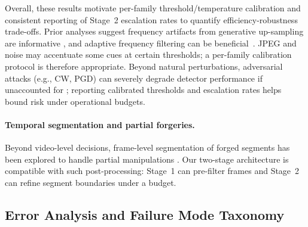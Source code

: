 Overall, these results motivate per\hyp family threshold/temperature calibration and consistent reporting of Stage~2 escalation rates to quantify efficiency\hyp robustness trade\hyp offs. Prior analyses suggest frequency artifacts from generative up\hyp sampling are informative \cite{durall2020watch}, and adaptive frequency filtering can be beneficial~\cite{qian2020thinkingfrequency}. JPEG and noise may accentuate some cues at certain thresholds; a per\hyp family calibration protocol is therefore appropriate. Beyond natural perturbations, adversarial attacks (e.g., CW, PGD) can severely degrade detector performance if unaccounted for \cite{carlini2017towards}; reporting calibrated thresholds and escalation rates helps bound risk under operational budgets.

\paragraph{Temporal segmentation and partial forgeries.} Beyond video\hyp level decisions, frame\hyp level segmentation of forged segments has been explored to handle partial manipulations \cite{undercover2023}. Our two\hyp stage architecture is compatible with such post\hyp processing: Stage~1 can pre\hyp filter frames and Stage~2 can refine segment boundaries under a budget.


\FloatBarrier


\subsection{Error Analysis and Failure Mode Taxonomy}
\label{subsec:error_analysis}

